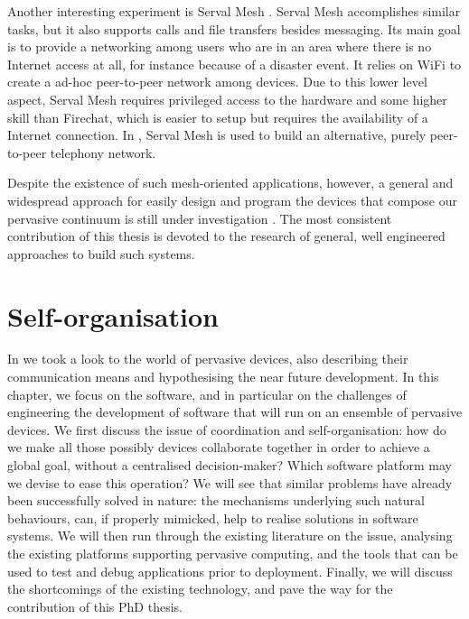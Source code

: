 \documentclass[12pt,a4paper,twoside,openright]{book}
\begin{document}
Another interesting experiment is Serval Mesh \cite{serval-mesh}.
%
Serval Mesh accomplishes similar tasks, but it also supports calls and file transfers besides messaging.
%
Its main goal is to provide a networking among users who are in an area where there is no Internet access at all, for instance because of a disaster event.
%
It relies on WiFi to create a ad-hoc peer-to-peer network among devices.
%
Due to this lower level aspect, Serval Mesh requires privileged access to the hardware and some higher skill than Firechat, which is easier to setup but requires the availability of a Internet connection.
%
In \cite{mesh-network-telephony}, Serval Mesh is used to build an alternative, purely peer-to-peer telephony network.

Despite the existence of such mesh-oriented applications, however, a general and widespread approach for easily design and program the devices that compose our pervasive continuum is still under investigation \cite{Ray13}.
%
The most consistent contribution of this thesis is devoted to the research of general, well engineered approaches to build such systems.

\chapter{Self-organisation}
\label{coordination-infrastructures}

In  we took a look to the world of pervasive devices, also describing their communication means and hypothesising the near future development.
%
In this chapter, we focus on the software, and in particular on the challenges of engineering the development of software that will run on an ensemble of pervasive devices.
%
We first discuss the issue of coordination and self-organisation: how do we make all those possibly devices collaborate together in order to achieve a global goal, without a centralised decision-maker?
%
Which software platform may we devise to ease this operation?
%
We will see that similar problems have already been successfully solved in nature: the mechanisms underlying such natural behaviours, can, if properly mimicked, help to realise solutions in software systems.
%
We will then run through the existing literature on the issue, analysing the existing platforms supporting pervasive computing, and the tools that can be used to test and debug applications prior to deployment.
%
Finally, we will discuss the shortcomings of the existing technology, and pave the way for the contribution of this PhD thesis.
\end{document}
